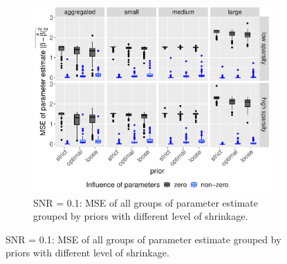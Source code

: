 \documentclass[12pt,letterpaper]{article}
\numberwithin{equation}{subsection}
\begin{document}
\begin{figure}[hbt!]
 \centering
\begin{subfigure}[b]{0.7\textwidth}
 \includegraphics[width=\textwidth]{../plots/lp-paramMSE1.pdf}
 \caption{SNR = 0.1:  MSE of all groups of parameter estimate grouped by priors with different level of shrinkage.}
 \label{fig:lp-pmse-0.1}
\end{subfigure} 
 \end{figure}
\end{document}
